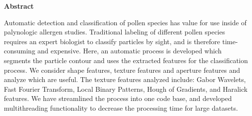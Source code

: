 \textbf{Abstract\textbf{}}


Automatic detection and classification of pollen species has value for use inside of palynologic allergen studies. Traditional labeling of different pollen species requires an expert biologist to classify particles by sight, and is therefore time-consuming and expensive. Here, an automatic process is developed which segments the particle contour and uses the extracted features for the classification process. We consider shape features, texture features and aperture features and analyze which are useful. The texture features analyzed include: Gabor Wavelets, Fast Fourier Transform, Local Binary Patterns, Hough of Gradients, and Haralick features. We have streamlined the process into one code base, and developed multithreading functionality to decrease the processing time for large datasets.
    
    
    
    
    